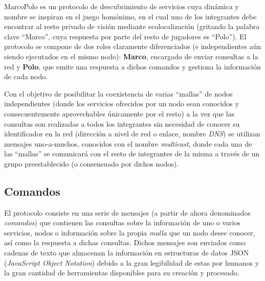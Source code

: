 MarcoPolo es un protocolo de descubrimiento de servicios cuya dinámica y nombre se inspiran en el juego homónimo\citationneeded, en el cual uno de los integrantes debe encontrar al resto privado de visión mediante ecolocalización (gritando la palabra clave ``Marco'', cuya respuesta por parte del resto de jugadores es ``Polo''). El protocolo se compone de dos roles claramente diferenciados (e independientes aún siendo ejecutados en el mismo nodo): \textbf{Marco}, encargado de enviar consultas a la red y \textbf{Polo}, que emite una respuesta a dichos comandos y gestiona la información de cada nodo. %

Con el objetivo de posibilitar la coexistencia de varias ``mallas'' de nodos independientes (donde los servicios ofrecidos por un nodo sean conocidos y consecuentemente aprovechables únicamente por el resto) a la vez que las consultas son realizadas a todos los integrantes sin necesidad de conocer su identificador en la red (dirección a nivel de red o enlace, nombre \textit{DNS}) se utilizan mensajes uno-a-muchos, conocidos con el nombre \textit{multicast}, donde cada una de las ``mallas'' se comunicará con el resto de integrantes de la misma a través de un grupo preestablecido (o consensuado por dichos nodos).

\subsection{Comandos}

El protocolo consiste en una serie de mensajes (a partir de ahora denominados \textit{comandos}) que contienen las consultas sobre la información de uno o varios servicios, nodos o información sobre la propia \textit{malla} que un nodo desee conocer, así como la respuesta a dichas consultas. Dichos mensajes son enviados como cadenas de texto que almacenan la información en estructuras de datos JSON (\textit{JavaScript Object Notation}) debido a la gran legibilidad de estas por humanos y la gran cantidad de herramientas disponibles para su creación y procesado.

